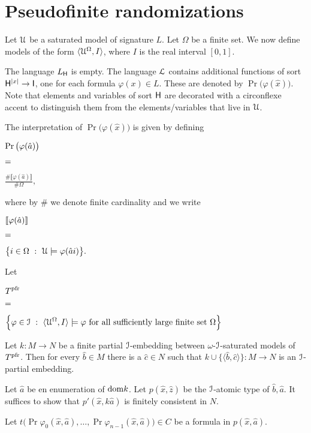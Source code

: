\documentclass[10pt,oneside]{amsproc}
\begin{document}
\section{Pseudofinite randomizations}

\def\ceq#1#2#3{\parbox[t]{20ex}{$\displaystyle #1$}\parbox[t]{6ex}{$\displaystyle\hfil #2$}{$\displaystyle #3$}}

Let ${\EuScript U}$ be a saturated model of signature $L$.
Let $\Omega$ be a finite set.
We now define models of the form $\langle{\EuScript U}^\Omega, I\rangle$, where $I$ is the real interval $[0,1]$.

The language $L_{\sf H}$ is empty.
The language ${\EuScript L}$ contains additional functions of sort ${\sf H}^{|x|}\to{\sf I}$, one for each formula $\varphi(x)\in L$.
These are denoted by $\Pr\big(\varphi(\hat x)\big)$. 
Note that elements and variables of sort ${\sf H}$ are decorated with a circonflexe accent to distinguish them from the elements/variables that live in ${\EuScript U}$.

The interpretation of $\Pr\big(\varphi(\hat x)\big)$ is given by defining

\ceq{\hfill\Pr\big(\varphi(\hat a)\big)}
{=}
{\frac{\#\llbracket\varphi(\hat a)\rrbracket}{\#\Omega},}

where by $\#$ we denote finite cardinality and we write

\ceq{\hfill\llbracket\varphi(\hat a)\rrbracket}{=}{\big\{i\in\Omega\ :\ {\EuScript U}\models\varphi(\hat ai)\big\}.}

Let 

\ceq{\hfill T^{\rm pfr}}
{=}
{\Big\{\varphi\in{\EuScript I}\ :\ \langle{\EuScript U}^\Omega, I\rangle\models\varphi\textrm{ for all sufficiently large finite set }\Omega\Big\}}

Let $k:M\to N$ be a finite partial ${\EuScript I}$-embedding between $\omega$-${\EuScript I}$-saturated models of $T^{\rm pfr}$.
Then for every $\hat b\in M$ there is a $\hat c\in N$ such that $k\cup\{\langle\hat b,\hat c\rangle\}:M\to N$ is an ${\EuScript I}$-partial embedding.

Let $\hat a$ be en enumeration of ${\rm dom} k$.
Let $p(\hat x,\hat z)$ be the ${\EuScript I}$-atomic type of $\hat b,\hat a$.
It suffices to show that $p'(\hat x,k\hat a)$ is finitely consistent in $N$. 

Let $t\big(\Pr\varphi_0(\hat x,\hat a),\dots,\Pr\varphi_{n-1}(\hat x,\hat a)\big)\in C$ be a formula in $p(\hat x,\hat a)$.
\end{document}
